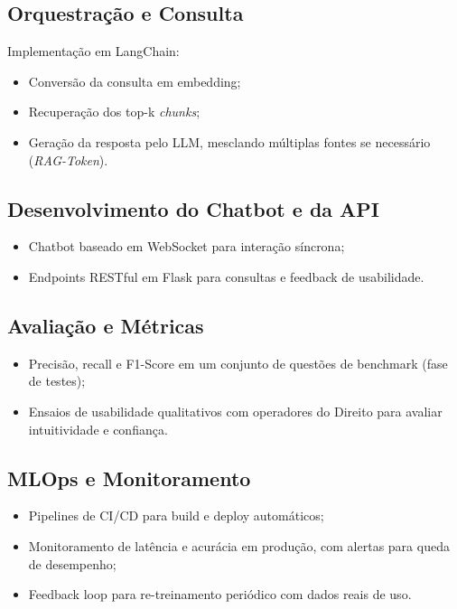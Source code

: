\begin{description}
\subsection{Orquestração e Consulta}
Implementação em LangChain:
\begin{itemize}[label=\textbullet]
  \item Conversão da consulta em embedding;
  \item Recuperação dos top-k \emph{chunks};
  \item Geração da resposta pelo LLM, mesclando múltiplas fontes se necessário (\emph{RAG-Token}).
\end{itemize}

\subsection{Desenvolvimento do Chatbot e da API}
\begin{itemize}[label=\textbullet]
  \item Chatbot baseado em WebSocket para interação síncrona;
  \item Endpoints RESTful em Flask para consultas e feedback de usabilidade.
\end{itemize}

\subsection{Avaliação e Métricas}
\begin{itemize}[label=\textbullet]
  \item Precisão, recall e F1-Score em um conjunto de questões de benchmark (fase de testes);
  \item Ensaios de usabilidade qualitativos com operadores do Direito para avaliar intuitividade e confiança.
\end{itemize}

\subsection{MLOps e Monitoramento}
\begin{itemize}[label=\textbullet]
  \item Pipelines de CI/CD para build e deploy automáticos;
  \item Monitoramento de latência e acurácia em produção, com alertas para queda de desempenho;
  \item Feedback loop para re-treinamento periódico com dados reais de uso.
\end{itemize}


\end{description}
